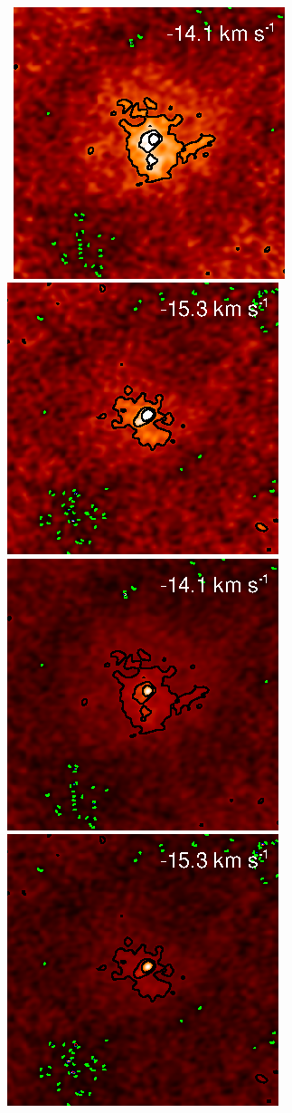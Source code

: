 \documentclass[preprint]{aastex}
\begin{document}
\begin{figure}
{          }
\\
\mbox{
          \includegraphics[]{test38.ps}
          \includegraphics[]{test39.ps}
          \includegraphics[]{test_38.ps}
          \includegraphics[]{test_39.ps}
}
\end{figure}
\end{document}
